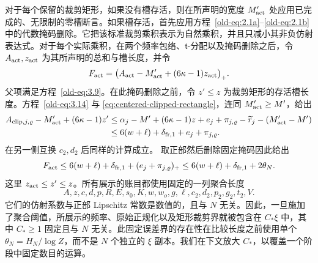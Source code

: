 对于每个保留的裁剪矩形，如果没有槽存活，则在所声明的宽度 \(M'_{\rm act}\) 处应用已完成的、无限制的零槽断言。如果槽存活，首先应用方程~\eqref{old-eq:2.1a}--\eqref{old-eq:2.1b} 中的代数掩码删除。它把该标准裁剪乘积表示为自然乘积，并且只减小其非负仿射表达式。对于每个实际乘积，在两个频率包络、\(\mathfrak t\)-分配以及掩码删除之后，令 \(A_{\rm act},z_{\rm act}\) 为其所声明的总和与槽长度，并令
\[
 F_{\rm act}
 =\bigl(A_{\rm act}-M'_{\rm act}+(6\kappa-1)z_{\rm act}\bigr)_+.
\]
父项满足方程~\eqref{old-eq:3.9}。在此掩码删除之前，令 \(z'\le z\) 为裁剪矩形的存活槽长度。方程~\eqref{old-eq:3.14} 与 \eqref{eq:centered-clipped-rectangle}，连同 \(M'_{\rm act}\ge M'\)，给出
\[
 \begin{split}
 A_{{\rm clip},j,\varrho}-M'_{\rm act}+(6\kappa-1)z'
 &\le \alpha_j-M'+(6\kappa-1)z
       +e_j+\pi_{j,\varrho}-\widetilde r_j-(M'_{\rm act}-M')\\
 &\le6(w+\ell)+\delta_{{\rm fr},1}+e_j+\pi_{j,\varrho}.
 \end{split}
\]
在另一侧互换 \(c_2,d_2\) 后同样的计算成立。
取正部然后删除固定掩码因此给出
\[
 F_{\rm act}\le6(w+\ell)+\delta_{{\rm fr},1}
                 +(e_j+\pi_{j,\varrho})_+
 \le6(w+\ell)+\delta_{{\rm fr},1}+2\theta_N.
\]
这里 \(z_{\rm act}\le z'\le z\)。所有展示的账目都使用固定的一列聚合长度
\[
 A,z,c,d,p,R,E,s_0,K,w,w_o,g,\ell,c_2,d_2,p_2,g_2,t_2,V.
\]
它们的仿射系数与正部 Lipschitz 常数是数值的，且与 \(N\) 无关。因此，一旦施加了聚合阈值，所展示的频率、原始正规化以及矩形裁剪界就被包含在 \(C_*\xi\) 中，其中 \(C_*\ge1\) 固定且与 \(N\) 无关。此固定误差界的存在性在比较长度之前使用单个 \(\theta_N=H_N/\log Z\)，而不是 \(N\) 个独立的 \(\xi\) 副本。我们在下文放大 \(C_*\)，以覆盖一个阶段中固定数目的运算。

